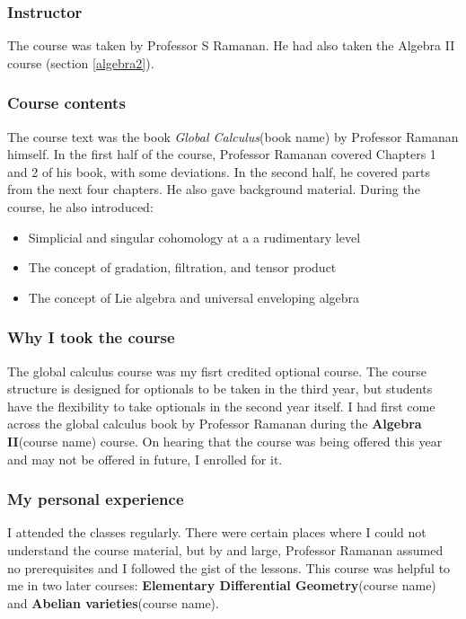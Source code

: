 \documentclass[a4paper]{amsart}
\newcommand{\coursename}[1]{{\bf #1}{\small{(course name)}}}
\newcommand{\bookname}[1]{{\em #1}{\small{(book name)}}}
\begin{document}
\subsubsection{Instructor}

The course was taken by Professor S Ramanan. He had also taken the Algebra II course (section \ref{algebra2}).

\subsubsection{Course contents}

The course text was the book \bookname{Global Calculus} by Professor Ramanan himself. In the first half of the course,
Professor Ramanan covered Chapters 1 and 2 of his book, with some deviations. In the second half, he covered parts
from the next four chapters. He also gave background material. During the course, he also introduced:

\begin{itemize}

\item Simplicial and singular cohomology at a a rudimentary level

\item The concept of gradation, filtration, and tensor product

\item The concept of Lie algebra and universal enveloping algebra

\end{itemize}

\subsubsection{Why I took the course}

The global calculus course was my fisrt credited optional course. The
course structure is designed for optionals to be taken in the third
year, but students have the flexibility to take optionals in the
second year itself.  I had first come across the global calculus book
by Professor Ramanan during the \coursename{Algebra II} course. On
hearing that the course was being offered this year and may not be
offered in future, I enrolled for it.

\subsubsection{My personal experience}


I attended the classes regularly. There were certain places where I could not
understand the course material, but by and large, Professor Ramanan assumed
no prerequisites and I followed the gist of the lessons. This course was 
helpful to me in two later courses: \coursename{Elementary Differential Geometry} and \coursename{Abelian varieties}.
\end{document}
